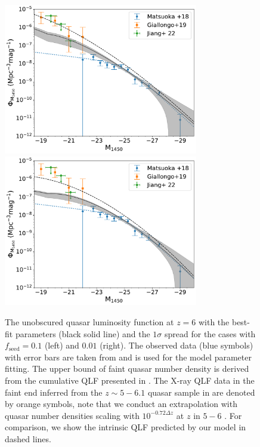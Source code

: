 \documentclass[twocolumn, twocolappendix]{aastex63}
\newcommand{\fseed}{f_\mathrm{seed}}
\begin{document}
\begin{CJK*}{UTF8}{gbsn}
\begin{figure}
\centering
\includegraphics[width=85mm]{f1ndraw60LF_spread.pdf}\hspace{3mm}
\includegraphics[width=85mm]{f2ndraw60LF_spread.pdf}
\caption{
The unobscured quasar luminosity function at $z=6$ with the best-fit parameters (black solid line) and the $1\sigma$ spread for the cases with $\fseed=0.1$ (left) and $0.01$ (right).
The observed data (blue symbols) with error bars are taken from  and is used for the model parameter fitting.
The upper bound of faint quasar number density is derived from the cumulative QLF presented in \citet{2022NatAs...6..850J}.
The X-ray QLF data in the faint end inferred from the $z\sim 5-6.1$ quasar sample in \citet{2019ApJ...884...19G} are denoted by orange symbols,
note that we conduct an extrapolation with quasar number densities scaling with $10^{-0.72\Delta z}$ at $z$ in $5-6$ \citep{2016ApJ...833..222J}.
For comparison, we show the intrinsic QLF predicted by our model in dashed lines.
}
\label{fig:fitlf}
\vspace{2mm}
\end{figure}




\end{CJK*}
\end{document}
